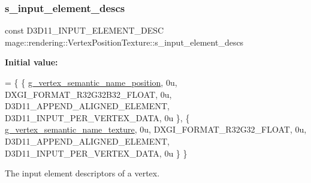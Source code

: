 \subsubsection{\texorpdfstring{s\+\_\+input\+\_\+element\+\_\+descs}{s\_input\_element\_descs}}
{\footnotesize\ttfamily const D3\+D11\+\_\+\+I\+N\+P\+U\+T\+\_\+\+E\+L\+E\+M\+E\+N\+T\+\_\+\+D\+E\+SC mage\+::rendering\+::\+Vertex\+Position\+Texture\+::s\+\_\+input\+\_\+element\+\_\+descs\hspace{0.3cm}{\ttfamily [static]}}

{\bfseries Initial value\+:}
\begin{DoxyCode}
= \{
        \{ \mbox{\hyperlink{namespacemage_1_1rendering_1_1anonymous__namespace_02vertex_8cpp_03_a6e875b92e4de38b14e8dc404df41a5ad}{g\_vertex\_semantic\_name\_position}}, 0u, DXGI\_FORMAT\_R32G32B32\_FLOAT, 
         0u, D3D11\_APPEND\_ALIGNED\_ELEMENT, D3D11\_INPUT\_PER\_VERTEX\_DATA, 0u \},
        \{ \mbox{\hyperlink{namespacemage_1_1rendering_1_1anonymous__namespace_02vertex_8cpp_03_a76de570f9dcc80db1e8e2f0a19536085}{g\_vertex\_semantic\_name\_texture}},  0u, DXGI\_FORMAT\_R32G32\_FLOAT,     
        0u, D3D11\_APPEND\_ALIGNED\_ELEMENT, D3D11\_INPUT\_PER\_VERTEX\_DATA, 0u \}
    \}
\end{DoxyCode}
The input element descriptors of a vertex. 